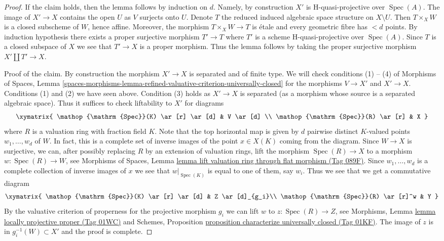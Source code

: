 \documentclass{amsart}
\theoremstyle{plain}
\theoremstyle{definition}
\theoremstyle{remark}
\numberwithin{equation}{subsection}
\def\Spec{\mathop{\mathrm{Spec}}}
\begin{document}
\begin{proof}
\medskip\noindent
If the claim holds, then the lemma follows by induction on $d$.
Namely, by construction $X'$ is H-quasi-projective over $\Spec(A)$.
The image of $X' \to X$ contains the open $U$ as $V$ surjects onto $U$.
Denote $T$ the reduced induced algebraic space structure on $X \setminus U$.
Then $T \times_X W$ is a closed subscheme of $W$, hence affine.
Moreover, the morphism $T \times_X W \to T$ is \'etale and every geometric
fibre has $< d$ points. By induction hypothesis there exists a proper
surjective morphism $T' \to T$ where $T'$ is a scheme H-quasi-projective
over $\Spec(A)$. Since $T$ is a closed subspace of $X$ we see that
$T' \to X$ is a proper morphism. Thus the lemma follows by taking the
proper surjective morphism $X' \amalg T' \to X$.

\medskip\noindent
Proof of the claim. By construction the morphism $X' \to X$ is separated
and of finite type. We will check conditions (1) -- (4) of
Morphisms of Spaces, Lemma
\ref{spaces-morphisms-lemma-refined-valuative-criterion-universally-closed}
for the morphisms $V \to X'$ and $X' \to X$.
Conditions (1) and (2) we have seen above.
Condition (3) holds as $X' \to X$ is separated (as a morphism whose
source is a separated algebraic space). Thus it suffices to check
liftability to $X'$ for diagrams
$$
\xymatrix{
\Spec(K) \ar[r] \ar[d] & V \ar[d] \\
\Spec(R) \ar[r] & X
}
$$
where $R$ is a valuation ring with fraction field $K$.
Note that the top horizontal map is given by $d$ pairwise distinct
$K$-valued points $w_1, \ldots, w_d$ of $W$. In fact, this
is a complete set of inverse images of the point $x \in X(K)$
coming from the diagram. Since $W \to X$ is surjective,
we can, after possibly replacing $R$ by an extension of valuation rings,
lift the morphism $\Spec(R) \to X$ to a morphism $w : \Spec(R) \to W$, see
Morphisms of Spaces, Lemma
\href{https://stacks.math.columbia.edu/tag/089F}{lemma lift valuation ring through flat morphism (Tag 089F)}.
Since $w_1, \ldots, w_d$ is a complete collection of inverse images of
$x$ we see that $w|_{\Spec(K)}$ is equal to one of them, say $w_i$.
Thus we see that we get a commutative diagram
$$
\xymatrix{
\Spec(K) \ar[r] \ar[d] &  Z \ar[d]_{g_i}\\
\Spec(R) \ar[r]^w & Y
}
$$
By the valuative criterion of properness for the projective
morphism $g_i$ we can lift $w$ to $z : \Spec(R) \to Z$, see
Morphisms, Lemma \href{https://stacks.math.columbia.edu/tag/01WC}{lemma locally projective proper (Tag 01WC)}
and
Schemes, Proposition \href{https://stacks.math.columbia.edu/tag/01KF}{proposition characterize universally closed (Tag 01KF)}.
The image of $z$ is in $g_i^{-1}(W) \subset X'$ and the proof is complete.
\end{proof}
\end{document}
